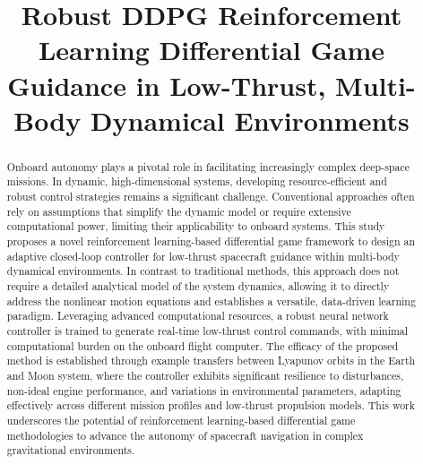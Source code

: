 \documentclass[conference]{IEEEtran}
\begin{document}
\title{Robust DDPG Reinforcement Learning Differential Game Guidance in Low-Thrust, Multi-Body Dynamical Environments}

\author{
\and
{}
}

\maketitle

\begin{abstract}
Onboard autonomy plays a pivotal role in facilitating increasingly complex deep-space missions.
In dynamic, high-dimensional systems, developing resource-efficient and robust control strategies remains a significant challenge.
Conventional approaches often rely on assumptions that simplify the dynamic model or require extensive computational power, limiting their applicability to onboard systems. 
This study proposes a novel reinforcement learning-based differential game framework to design an adaptive closed-loop controller for low-thrust spacecraft guidance within multi-body dynamical environments.
In contrast to traditional methods, this approach does not require a detailed analytical model of the system dynamics, allowing it to directly address the nonlinear motion equations and establishes a versatile, data-driven learning paradigm. Leveraging advanced computational resources, a robust neural network controller is trained to generate real-time low-thrust control commands, with minimal computational burden on the onboard flight computer. 
The efficacy of the proposed method is established through example transfers between Lyapunov orbits in the Earth and Moon system, where the controller exhibits significant resilience to disturbances, non-ideal engine performance, and variations in environmental parameters, adapting effectively across different  mission profiles and low-thrust propulsion models.
This work underscores the potential of reinforcement learning-based differential game methodologies to advance the autonomy of spacecraft navigation in complex gravitational environments.
\end{abstract}
\end{document}
